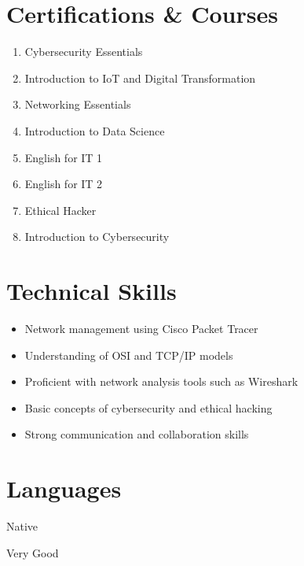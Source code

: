 \documentclass[11pt,a4paper]{article}
\begin{document}
\section*{Certifications \& Courses}
\begin{enumerate}
    \item Cybersecurity Essentials
    \item Introduction to IoT and Digital Transformation
    \item Networking Essentials
    \item Introduction to Data Science
    \item English for IT 1
    \item English for IT 2
    \item Ethical Hacker
    \item Introduction to Cybersecurity
\end{enumerate}

\section*{Technical Skills}
\begin{itemize}
    \item Network management using Cisco Packet Tracer
    \item Understanding of OSI and TCP/IP models
    \item Proficient with network analysis tools such as Wireshark
    \item Basic concepts of cybersecurity and ethical hacking
    \item Strong communication and collaboration skills
\end{itemize}

\section*{Languages}
\begin{description}[style=sameline,leftmargin=8em]
    \item[Arabic:] Native
    \item[English:] Very Good
\end{description}
\end{document}
